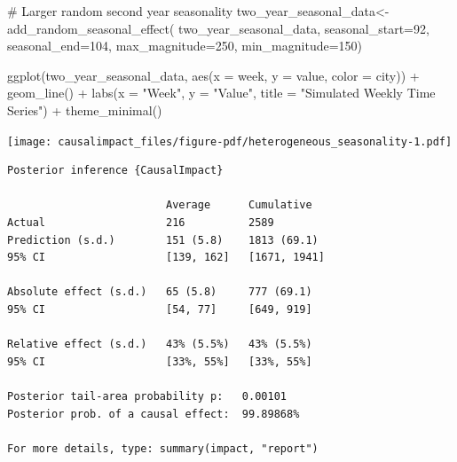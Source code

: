 \documentclass[
  letterpaper,
  DIV=11,
  numbers=noendperiod]{scrreprt}
\newenvironment{Shaded}{\begin{snugshade}}{\end{snugshade}}
\newcommand{\AttributeTok}[1]{\textcolor[rgb]{0.40,0.45,0.13}{#1}}
\newcommand{\CommentTok}[1]{\textcolor[rgb]{0.37,0.37,0.37}{#1}}
\newcommand{\DecValTok}[1]{\textcolor[rgb]{0.68,0.00,0.00}{#1}}
\newcommand{\FunctionTok}[1]{\textcolor[rgb]{0.28,0.35,0.67}{#1}}
\newcommand{\NormalTok}[1]{\textcolor[rgb]{0.00,0.23,0.31}{#1}}
\newcommand{\OtherTok}[1]{\textcolor[rgb]{0.00,0.23,0.31}{#1}}
\newcommand{\SpecialCharTok}[1]{\textcolor[rgb]{0.37,0.37,0.37}{#1}}
\newcommand{\StringTok}[1]{\textcolor[rgb]{0.13,0.47,0.30}{#1}}
\begin{document}
\begin{Shaded}
\begin{Highlighting}[]
\CommentTok{\# Larger random second year seasonality}
\NormalTok{two\_year\_seasonal\_data}\OtherTok{\textless{}{-}}\FunctionTok{add\_random\_seasonal\_effect}\NormalTok{(}
\NormalTok{  two\_year\_seasonal\_data,}
  \AttributeTok{seasonal\_start=}\DecValTok{92}\NormalTok{,}
  \AttributeTok{seasonal\_end=}\DecValTok{104}\NormalTok{,}
  \AttributeTok{max\_magnitude=}\DecValTok{250}\NormalTok{,}
  \AttributeTok{min\_magnitude=}\DecValTok{150}\NormalTok{)}


\FunctionTok{ggplot}\NormalTok{(two\_year\_seasonal\_data, }\FunctionTok{aes}\NormalTok{(}\AttributeTok{x =}\NormalTok{ week, }\AttributeTok{y =}\NormalTok{ value, }\AttributeTok{color =}\NormalTok{ city)) }\SpecialCharTok{+}
  \FunctionTok{geom\_line}\NormalTok{() }\SpecialCharTok{+}
  \FunctionTok{labs}\NormalTok{(}\AttributeTok{x =} \StringTok{"Week"}\NormalTok{, }\AttributeTok{y =} \StringTok{"Value"}\NormalTok{, }\AttributeTok{title =} \StringTok{"Simulated Weekly Time Series"}\NormalTok{) }\SpecialCharTok{+}
  \FunctionTok{theme\_minimal}\NormalTok{()}
\end{Highlighting}
\end{Shaded}

\texttt{[image: causalimpact\_files/figure-pdf/heterogeneous\_seasonality-1.pdf]}

\begin{Shaded}
\end{Shaded}

\begin{verbatim}
Posterior inference {CausalImpact}

                         Average      Cumulative  
Actual                   216          2589        
Prediction (s.d.)        151 (5.8)    1813 (69.1) 
95% CI                   [139, 162]   [1671, 1941]
                                                  
Absolute effect (s.d.)   65 (5.8)     777 (69.1)  
95% CI                   [54, 77]     [649, 919]  
                                                  
Relative effect (s.d.)   43% (5.5%)   43% (5.5%)  
95% CI                   [33%, 55%]   [33%, 55%]  

Posterior tail-area probability p:   0.00101
Posterior prob. of a causal effect:  99.89868%

For more details, type: summary(impact, "report")
\end{verbatim}
\end{document}
